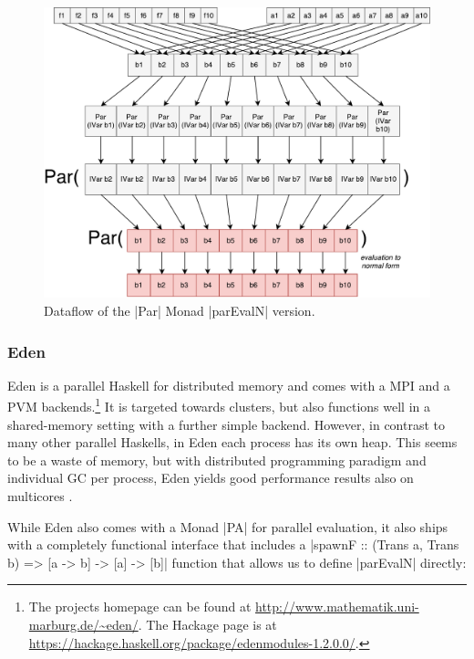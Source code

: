 \begin{figure}[t]
	\includegraphics[scale=0.5]{images/parEvalNParMonad}
	\caption{Dataflow of the |Par| Monad |parEvalN| version.}
	\label{fig:parEvalNParMonadImg}
\end{figure}

\subsubsection{Eden}
Eden \cite{eden,Loogen2012} is a parallel Haskell for distributed memory and comes with a MPI and a PVM backends.\footnote{The projects homepage can be found at \url{http://www.mathematik.uni-marburg.de/~eden/}. The Hackage page is at \url{https://hackage.haskell.org/package/edenmodules-1.2.0.0/}.} It is targeted towards clusters, but also functions well in a shared-memory setting with a further simple backend. However, in contrast to many other parallel Haskells, in Eden each process has its own heap. This seems to be a waste of memory, but with distributed programming paradigm and individual GC per process, Eden yields good performance results also on multicores \cite{arcs-dc,aswad2009low}.

While Eden also comes with a Monad |PA| for parallel evaluation, it also ships with a completely functional interface that includes
a |spawnF :: (Trans a, Trans b) => [a -> b] -> [a] -> [b]|
function that
allows us to define |parEvalN| directly:

